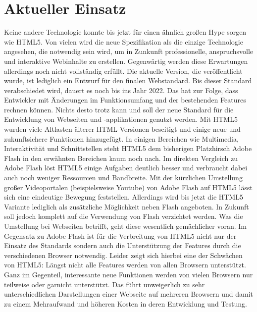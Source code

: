 \section{Aktueller Einsatz}
Keine andere Technologie konnte bis jetzt für einen ähnlich großen Hype sorgen
wie HTML5. Von vielen wird die neue Spezifikation als die einzige Technologie
angesehen, die notwendig sein wird, um in Zunkunft professionelle,
anspruchsvolle und interaktive Webinhalte zu erstellen. Gegenwärtig werden
diese Erwartungen allerdings noch nicht vollständig erfüllt. Die aktuelle
Version, die veröffentlicht wurde, ist lediglich ein Entwurf für den finalen
Webstandard. Bis dieser Standard verabschiedet wird, dauert es noch bis ins
Jahr 2022. Das hat zur Folge, dass Entwickler mit Änderungen im
Funktionsumfang und der bestehenden Features rechnen können.
\newline\newline
Nichts desto trotz kann und soll der neue Standard für die Entwicklung
von Webseiten und -applikationen genutzt werden. Mit HTML5 wurden viele
Altlasten älterer HTML Versionen beseitigt und einige neue und zukunftsichere
Funktionen hinzugefügt. In einigen Bereichen wie Multimedia, Interaktivität
und Schnittstellen steht HTML5 dem bisherigen Platzhirsch Adobe Flash in
den erwähnten Bereichen kaum noch nach. Im direkten Vergleich zu Adobe Flash
löst HTML5 einige Aufgaben deutlich besser und verbraucht dabei auch noch
weniger Ressourcen und Bandbreite.
\newline\newline
Mit der kürzlichen Umstellung großer Videoportalen (beispielsweise Youtube)
von Adobe Flash auf HTML5 lässt sich eine eindeutige Bewegung feststellen.
Allerdings wird bis jetzt die HTML5 Variante lediglich als zusätzliche
Möglichkeit neben Flash angeboten. In Zukunft soll jedoch komplett auf die
Verwendung von Flash verzichtet werden. Was die Umstellung bei Webseiten
betrifft, geht diese wesentlich gemächlicher voran.
\newline\newline
Im Gegensatz zu Adobe Flash ist für die Verbreitung von HTML5 nicht nur
der Einsatz des Standards sondern auch die Unterstützung der Features durch
die verschiedenen Browser notwendig. Leider zeigt sich hierbei eine der
Schwächen von HTML5: Längst nicht alle Features werden von allen Browsern
unterstützt. Ganz im Gegenteil, interessante neue Funktionen werden
von vielen Browsern nur teilweise oder garnicht unterstützt.
Das führt unweigerlich zu sehr unterschiedlichen Darstellungen einer
Webseite auf mehreren Browsern und damit zu einem Mehraufwand und höheren
Kosten in deren Entwicklung und Testung.

